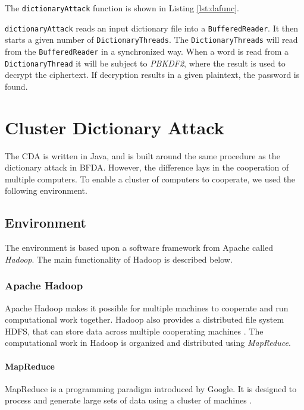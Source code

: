 \documentclass[pdftex,english,10pt,b5paper,twoside]{book}
\begin{document}
The \texttt{dictionaryAttack} function is shown in Listing \ref{lst:dafunc}.



\texttt{dictionaryAttack} reads an input dictionary file into a
\texttt{BufferedReader}. It then starts a given number of
\texttt{DictionaryThreads}. The \texttt{DictionaryThreads} will read from the
\texttt{BufferedReader} in a synchronized way. When a word is read from a
\texttt{DictionaryThread} it will be subject to \emph{PBKDF2}, where the result is
used to decrypt the ciphertext. If decryption results in a given plaintext, the
password is found.

\section{Cluster Dictionary Attack}

The \ac{CDA} is written in Java, and is built around the same procedure as the
dictionary attack in \ac{BFDA}. However, the difference lays in the cooperation
of multiple computers. To enable a cluster of computers to cooperate, we used
the following environment.

\subsection{Environment}

The environment is based upon a software framework from Apache called
\emph{Hadoop}. The main functionality of Hadoop is described below.

\subsubsection{Apache Hadoop}

Apache Hadoop makes it possible for multiple machines to cooperate
and run computational work together. Hadoop also provides a distributed file system
\ac{HDFS}, that can store data across multiple cooperating machines \cite{hadoop}. The
computational work in Hadoop is organized and distributed using \emph{MapReduce}.

\paragraph{MapReduce} MapReduce is a programming paradigm introduced by Google.
It is designed to process and generate large sets of data using a cluster of
machines \cite{mapred}.
\end{document}
